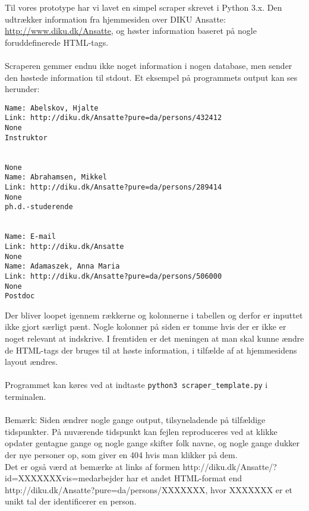 \documentclass[11pt]{article}
\begin{document}
Til vores prototype har vi lavet en simpel scraper skrevet i Python 3.x. Den udtrækker information fra hjemmesiden over DIKU Ansatte: \url{http://www.diku.dk/Ansatte}, og høster information baseret på nogle foruddefinerede HTML-tags.\\
\\
Scraperen gemmer endnu ikke noget information i nogen database, men sender den høstede information til stdout. Et eksempel på programmets output kan ses herunder:
\begin{lstlisting}
Name: Abelskov, Hjalte
Link: http://diku.dk/Ansatte?pure=da/persons/432412
None
Instruktor


None
Name: Abrahamsen, Mikkel
Link: http://diku.dk/Ansatte?pure=da/persons/289414
None
ph.d.-studerende


Name: E-mail
Link: http://diku.dk/Ansatte
None
Name: Adamaszek, Anna Maria
Link: http://diku.dk/Ansatte?pure=da/persons/506000
None
Postdoc
\end{lstlisting}
Der bliver loopet igennem rækkerne og kolonnerne i tabellen og derfor er inputtet ikke gjort særligt pænt. Nogle kolonner på siden er tomme hvis der er ikke er noget relevant at indskrive. I fremtiden er det meningen at man skal kunne ændre de HTML-tags der bruges til at høste information, i tilfælde af at hjemmesidens layout ændres.\\
\\
Programmet kan køres ved at indtaste \texttt{python3 scraper\_template.py} i terminalen.\\
\\
Bemærk: Siden ændrer nogle gange output, tilsyneladende på tilfældige tidspunkter. På nuværende tidspunkt kan fejlen reproduceres ved at klikke opdater gentagne gange og nogle gange skifter folk navne, og nogle gange dukker der nye personer op, som giver en 404 hvis man klikker på dem.\\
Det er også værd at bemærke at links af formen http://diku.dk/Ansatte/?id=XXXXXXXvis=medarbejder har et andet HTML-format end http://diku.dk/Ansatte?pure=da/persons/XXXXXXX, hvor XXXXXXX er et unikt tal der identificerer en person.\\
\end{document}
